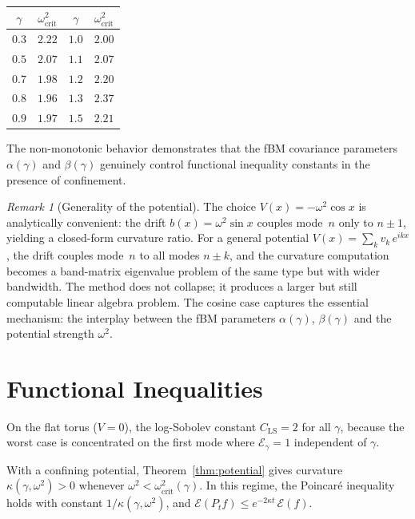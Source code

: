 \documentclass[11pt,a4paper]{article}
\theoremstyle{plain}
\theoremstyle{definition}
\theoremstyle{remark}
\newtheorem{remark}[theorem]{Remark}
\begin{document}
\medskip
\begin{center}
\begin{tabular}{cc|cc}
\toprule
$\gamma$ & $\omega^2_{\mathrm{crit}}$ &
$\gamma$ & $\omega^2_{\mathrm{crit}}$ \\
\midrule
$0.3$ & $2.22$ & $1.0$ & $2.00$ \\
$0.5$ & $2.07$ & $1.1$ & $2.07$ \\
$0.7$ & $1.98$ & $1.2$ & $2.20$ \\
$0.8$ & $1.96$ & $1.3$ & $2.37$ \\
$0.9$ & $1.97$ & $1.5$ & $2.21$ \\
\bottomrule
\end{tabular}
\end{center}

\medskip\noindent
The non-monotonic behavior demonstrates that the fBM covariance
parameters $\alpha(\gamma)$ and $\beta(\gamma)$ genuinely control
functional inequality constants in the presence of confinement.

\begin{remark}[Generality of the potential]\label{rem:potential-general}
The choice $V(x) = -\omega^2\cos x$ is analytically convenient:
the drift $b(x) = \omega^2\sin x$ couples mode~$n$ only to
$n \pm 1$, yielding a closed-form curvature ratio.
For a general potential $V(x) = \sum_k v_k\,e^{ikx}$, the drift
couples mode~$n$ to all modes $n \pm k$, and the curvature
computation becomes a band-matrix eigenvalue problem of the same
type but with wider bandwidth. The method does not collapse;
it produces a larger but still computable linear algebra problem.
The cosine case captures the essential mechanism: the interplay
between the fBM parameters $\alpha(\gamma)$, $\beta(\gamma)$ and
the potential strength $\omega^2$.
\end{remark}


\section{Functional Inequalities}\label{sec:func-ineq}

On the flat torus ($V = 0$), the log-Sobolev constant
$C_{\mathrm{LS}} = 2$ for all $\gamma$, because the worst case
is concentrated on the first mode where
$\mathcal{E}_\gamma = 1$ independent of $\gamma$.

With a confining potential, Theorem~\ref{thm:potential} gives
curvature $\kappa(\gamma,\omega^2) > 0$ whenever
$\omega^2 < \omega^2_{\mathrm{crit}}(\gamma)$.
In this regime, the Poincar\'e inequality holds with constant
$1/\kappa(\gamma,\omega^2)$, and
$\mathcal{E}(P_t f) \leq e^{-2\kappa t}\,\mathcal{E}(f)$.
\end{document}
